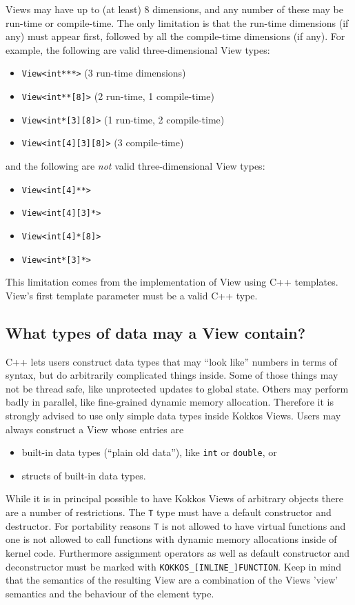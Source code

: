Views may have up to (at least) 8 dimensions, and any number of these
may be run-time or compile-time.  The only limitation is that the
run-time dimensions (if any) must appear first, followed by all the
compile-time dimensions (if any).  For example, the following are
valid three-dimensional View types:
\begin{itemize}
\item \lstinline!View<int***>!  (3 run-time dimensions)
\item \lstinline!View<int**[8]>!  (2 run-time, 1 compile-time)
\item \lstinline!View<int*[3][8]>!  (1 run-time, 2 compile-time)
\item \lstinline!View<int[4][3][8]>!  (3 compile-time)
\end{itemize}
and the following are \emph{not} valid three-dimensional View types:
\begin{itemize}
\item \lstinline!View<int[4]**>!
\item \lstinline!View<int[4][3]*>!
\item \lstinline!View<int[4]*[8]>!
\item \lstinline!View<int*[3]*>!
\end{itemize}
This limitation comes from the implementation of View using C++
templates.  View's first template parameter must be a valid C++ type.

\subsection{What types of data may a View contain?}

C++ lets users construct data types that may ``look like'' numbers in
terms of syntax, but do arbitrarily complicated things inside.  Some
of those things may not be thread safe, like unprotected updates to
global state.  Others may perform badly in parallel, like fine-grained
dynamic memory allocation.  Therefore it is strongly advised to use 
only simple data types inside Kokkos Views.
Users may always construct a View whose entries are 
\begin{itemize}
\item built-in data types (``plain old data''), like \texttt{int} or
  \texttt{double}, or
\item structs of built-in data types.
\end{itemize}

While it is in principal possible to have Kokkos Views of arbitrary 
objects there are a number of restrictions. The \lstinline|T| type 
must have a default constructor and destructor. For portability reasons
\lstinline|T| is not allowed to have virtual functions and one is not 
allowed to call functions with dynamic memory allocations inside of 
kernel code. Furthermore assignment operators as well as default constructor
and deconstructor must be marked with \lstinline|KOKKOS_[INLINE_]FUNCTION|. 
Keep in mind that the semantics of the resulting View are a combination of the 
Views 'view' semantics and the behaviour of the element type.

